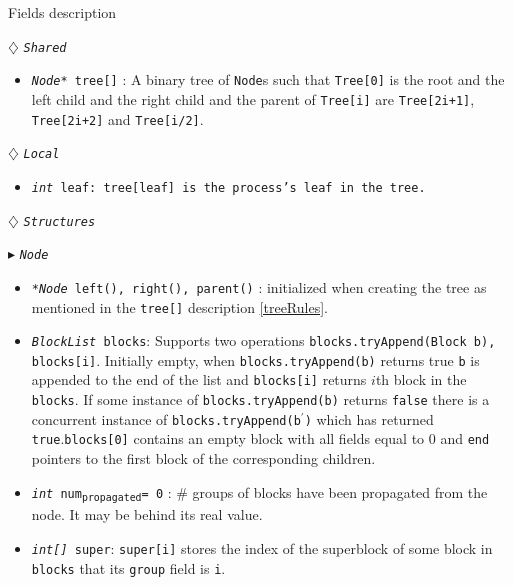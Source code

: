 \documentclass[10pt]{article}
\newcommand{\sub}[1]{\textsubscript{#1}}
\renewcommand{\tt}[1]{\texttt{#1}}
\renewcommand{\sl}[1]{\textsl{#1}}
\renewcommand{\bf}[1]{\textbf{#1}}
\theoremstyle{definition}
\begin{document}
\begin{algorithm}
\caption{Fields description}
\begin{algorithmic}[1]
\setcounter{ALG@line}{100}
\begin{multicols}{2}


\Statex $\diamondsuit$ \tt{\sl{Shared}}
\begin{itemize}
\item \tt{\sl{Node*} tree[]} \textsf{: A binary tree of \tt{Node}s such that \tt{Tree[0]} is the root and the left child and the right child and the parent of \tt{Tree[i]} are \tt{Tree[2i+1]}, \tt{Tree[2i+2]} and \tt{Tree[i/2]}.} \label{treeRules}
\end{itemize}

\Statex

\Statex $\diamondsuit$ \tt{\sl{Local}}
\begin{itemize}
\item \tt{\sl{int} leaf\textsf{: \tt{tree[leaf]} is the process's leaf in the tree.}}
\end{itemize}

\Statex
\Statex $\diamondsuit$ \tt{\sl{Structures}}

\Statex $\blacktriangleright$ \tt{\sl{Node}}
\begin{itemize}
\item \tt{\sl{*Node} left(), right(), parent()} \textsf{: initialized  when creating the tree as mentioned in the \tt{tree[]} description \ref{treeRules}.}
\item \tt{\sl{BlockList} blocks}\textsf{: Supports two operations \tt{blocks.tryAppend(Block b), blocks[i]}. Initially  empty, when \tt{blocks.tryAppend(b)} returns true \tt{b} is appended to the end of the list and \tt{blocks[i]} returns $i$th block in the \tt{blocks}. If some instance of \tt{blocks.tryAppend(b)} returns \tt{false} there is a concurrent instance of \tt{blocks.tryAppend(b$^\prime$)} which has returned \tt{true}.\tt{blocks[0]} contains an empty block with all fields equal to 0 and \tt{end} pointers to the first block of the corresponding children.}

\item \tt{\sl{int} num\sub{propagated}= 0}\textsf{} \textsf{: \# groups of blocks have been propagated from the node. It may be behind its real value.}
\item \tt{\sl{int[]} super}\textsf{: \tt{super[i]} stores the index of the superblock of some block in \tt{blocks} that its \tt{group} field is \tt{i}.}
\end{itemize}


\end{multicols}
\end{algorithmic}
\end{algorithm}
\end{document}
